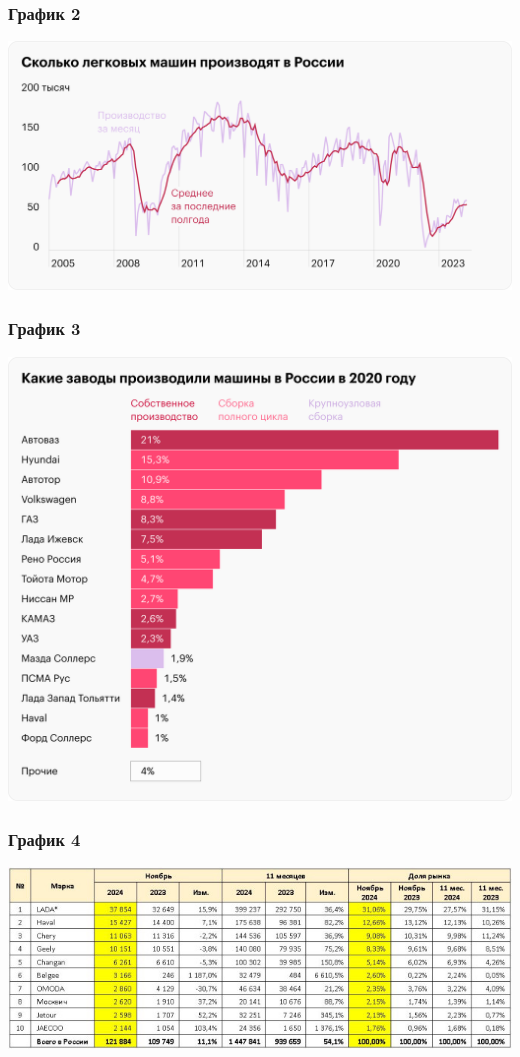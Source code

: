 \begin{frame}
    \frametitle{График 2}
    \begin{center}
        \centering
        \includegraphics[width=1\linewidth]{Media/Images/plot-2.png}
    \end{center}
\end{frame}

\begin{frame}
    \frametitle{График 3}
    \begin{center}
        \centering
        \includegraphics[width=0.65\linewidth]{Media/Images/plot-3.png}
    \end{center}
\end{frame}

\begin{frame}
    \frametitle{График 4}
    \begin{center}
        \centering
        \includegraphics[width=1\linewidth]{Media/Images/plot-4.png}
    \end{center}
\end{frame}

